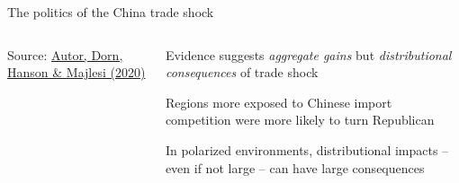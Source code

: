 \documentclass[notes,11pt, aspectratio=169, xcolor=table]{beamer}
\newenvironment{wideitemize}{\itemize\addtolength{\itemsep}{10pt}}{\enditemize}
\begin{document}
\begin{frame}{The politics of the China trade shock}

\begin{columns}[T] %
\begin{column}{.50\textwidth}
\centering
    \vspace{12pt}
    { \scriptsize
    Source: \href{https://www.aeaweb.org/articles?id=10.1257/aer.20170011}{Autor, Dorn, Hanson \& Majlesi (2020)}
    }
\end{column}%
\hfill%
\begin{column}{.50\textwidth}
{\small
\begin{wideitemize}

    \item Evidence suggests \textit{aggregate gains} but \textit{distributional consequences} of trade shock

    \item Regions more exposed to Chinese import competition were more likely to turn Republican

    \item In polarized environments, distributional impacts -- even if not large -- can have large consequences 
   
\end{wideitemize}
}
\end{column}%
\end{columns}

\end{frame}
\end{document}
